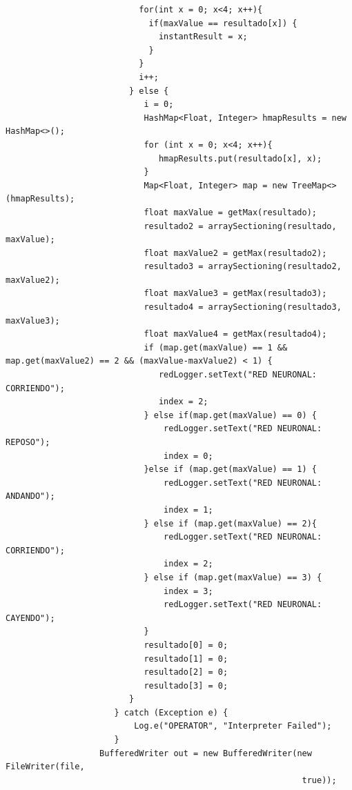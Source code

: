 \documentclass[12pt]{book}
\numberwithin{equation}{section}
\begin{document}
\begin{appendices}
\begin{verbatim}
                           for(int x = 0; x<4; x++){
                             if(maxValue == resultado[x]) {
                               instantResult = x;
                             }
                           }
                           i++;
                         } else {
                            i = 0;
                            HashMap<Float, Integer> hmapResults = new HashMap<>();
                            for (int x = 0; x<4; x++){
                               hmapResults.put(resultado[x], x);
                            }
                            Map<Float, Integer> map = new TreeMap<>(hmapResults);
                            float maxValue = getMax(resultado);
                            resultado2 = arraySectioning(resultado, maxValue);
                            float maxValue2 = getMax(resultado2);
                            resultado3 = arraySectioning(resultado2, maxValue2);
                            float maxValue3 = getMax(resultado3);
                            resultado4 = arraySectioning(resultado3, maxValue3);
                            float maxValue4 = getMax(resultado4);
                            if (map.get(maxValue) == 1 && map.get(maxValue2) == 2 && (maxValue-maxValue2) < 1) {
                               redLogger.setText("RED NEURONAL: CORRIENDO");
                               index = 2;
                            } else if(map.get(maxValue) == 0) {
                                redLogger.setText("RED NEURONAL: REPOSO");
                                index = 0;
                            }else if (map.get(maxValue) == 1) {
                                redLogger.setText("RED NEURONAL: ANDANDO");
                                index = 1;
                            } else if (map.get(maxValue) == 2){
                                redLogger.setText("RED NEURONAL: CORRIENDO");
                                index = 2;
                            } else if (map.get(maxValue) == 3) {
                                index = 3;
                                redLogger.setText("RED NEURONAL: CAYENDO");
                            }
                            resultado[0] = 0;
                            resultado[1] = 0;
                            resultado[2] = 0;
                            resultado[3] = 0;
                         }
                      } catch (Exception e) {
                          Log.e("OPERATOR", "Interpreter Failed");
                      }
                   BufferedWriter out = new BufferedWriter(new FileWriter(file, 
                   											true));

\end{verbatim}
\end{appendices}
\end{document}
